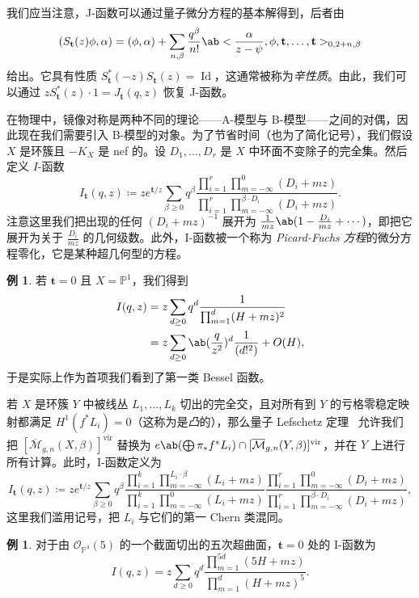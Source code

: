 \documentclass{amsart}
\theoremstyle{definition}
\newtheorem{exm}[thm]{例}
\theoremstyle{remark}
\theoremstyle{plain}
\theoremstyle{definition}
\theoremstyle{remark}
\renewcommand{\P}{\mathbb{P}}
\newcommand{\Mbar}{\overline{\mathcal{M}}}
\newcommand{\mc}[1]{\mathcal{#1}}
\newcommand{\mbf}[1]{\mathbf{#1}}
\newcommand{\mr}[1]{\mathrm{#1}}
\newcommand{\on}[1]{\operatorname{#1}}
\newcommand{\1}{\mathbf{1}}
\newcommand{\2}{\mathbf{2}}
\newcommand{\3}{\mathbf{3}}
\newcommand{\vir}{\mr{vir}}
\begin{document}
我们应当注意，J-函数可以通过量子微分方程的基本解得到，后者由
\[ ( S_{\mbf{t}}(z) \phi , \alpha) = (\phi, \alpha) + \sum_{n, \beta} \frac{q^{\beta}}{n!} \ab<\frac{\alpha}{z-\psi}, \phi, \mbf{t}, \ldots, \mbf{t}>_{0, 2+n, \beta} \]
给出。它具有性质 \(S_{\mbf{t}}^*(-z) S_{\mbf{t}}(z) = \on{Id}\)，这通常被称为\textit{辛性质}。由此，我们可以通过 \(z S_{\mbf{t}}^*(z)\cdot 1 = J_{\mbf{t}}(q, z)\) 恢复 J-函数。

在物理中，镜像对称是两种不同的理论——A-模型与 B-模型——之间的对偶，因此现在我们需要引入 B-模型的对象。为了节省时间（也为了简化记号），我们假设 \(X\) 是环簇且 \(-K_X\) 是 nef 的。设 \(D_1, \ldots, D_r\) 是 \(X\) 中环面不变除子的完全集。然后定义 \(I\)-函数
\[
    I_{\mbf{t}}(q, z) \coloneqq z e^{\mbf{t}/z} \sum_{\beta \geq 0} q^{\beta} \frac{\prod_{i=1}^r \prod_{m = -\infty}^{0} (D_i + mz)}{\prod_{i=1}^r \prod_{m=-\infty}^{\beta \cdot D_i} (D_i + mz)}.
\]
注意这里我们把出现的任何 \((D_i + mz)^{-1}\) 展开为 \(\frac{1}{mz} \ab(1 - \frac{D_i}{mz} + \cdots)\)，即把它展开为关于 \(\frac{D_i}{mz}\) 的几何级数。此外，I-函数被一个称为 \textit{Picard-Fuchs 方程}的微分方程零化，它是某种超几何型的方程。

\begin{exm}
    若 \(\mbf{t} = 0\) 且 \(X = \P^1\)，我们得到
    \begin{align*}
        I(q,z) &= z\sum_{d \geq 0} q^d \frac{1}{\prod_{m=1}^d (H + mz)^2} \\
        &= z\sum_{d \geq 0} \ab(\frac{q}{z^2})^d \frac{1}{(d!^2)} + O(H),
    \end{align*}
    于是实际上作为首项我们看到了第一类 Bessel 函数。
\end{exm}

若 \(X\) 是环簇 \(Y\) 中被线丛 \(L_1, \ldots, L_k\) 切出的完全交，且对所有到 \(Y\) 的亏格零稳定映射都满足 \(H^1(f^* L_i) = 0\)（这称为是\textit{凸}的），那么量子 Lefschetz 定理~\cite{CoatesGivental2007} 允许我们把 \([\Mbar_{g,n}(X, \beta)]^{\vir}\) 替换为 \(e\ab(\bigoplus \pi_* f^* L_i) \cap [\Mbar_{g,n}(Y, \beta)]^{\vir}\)，并在 \(Y\) 上进行所有计算。此时，I-函数定义为
\[
    I_{\mbf{t}}(q,z) \coloneqq z e^{\mbf{t}/z} \sum_{\beta \geq 0} q^{\beta} \frac{\prod_{i=1}^k \prod_{m=-\infty}^{L_i \cdot \beta} (L_i + mz)}{\prod_{i=1}^k \prod_{m=-\infty}^{0} (L_i + mz)} \frac{\prod_{i=1}^r \prod_{m = -\infty}^{0} (D_i + mz)}{\prod_{i=1}^r \prod_{m=-\infty}^{\beta \cdot D_i} (D_i + mz)},
\]
这里我们滥用记号，把 \(L_i\) 与它们的第一 Chern 类混同。

\begin{exm}
    对于由 \(\mc{O}_{\P^4}(5)\) 的一个截面切出的五次超曲面，\(\mbf{t} = 0\) 处的 I-函数为
    \[ I(q,z) = z \sum_{d \geq 0} q^d \frac{\prod_{m=1}^{5d}(5H+mz)}{\prod_{m=1}^d (H+mz)^5}. \]
\end{exm}
\end{document}
